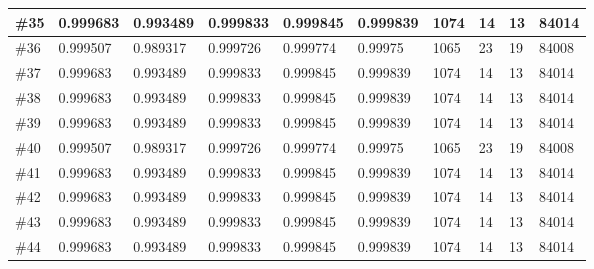 \begin{longtable}{l|l|l|l|l|l|l|l|l|l}
\#35 & 0.999683 & 0.993489 & 0.999833 & 0.999845 & 0.999839 & 1074 & 14 & 13 & 84014 \\ \hline
\#36 & 0.999507 & 0.989317 & 0.999726 & 0.999774 & 0.99975  & 1065 & 23 & 19 & 84008 \\ \hline
\#37 & 0.999683 & 0.993489 & 0.999833 & 0.999845 & 0.999839 & 1074 & 14 & 13 & 84014 \\ \hline
\#38 & 0.999683 & 0.993489 & 0.999833 & 0.999845 & 0.999839 & 1074 & 14 & 13 & 84014 \\ \hline
\#39 & 0.999683 & 0.993489 & 0.999833 & 0.999845 & 0.999839 & 1074 & 14 & 13 & 84014 \\ \hline
\#40 & 0.999507 & 0.989317 & 0.999726 & 0.999774 & 0.99975  & 1065 & 23 & 19 & 84008 \\ \hline
\#41 & 0.999683 & 0.993489 & 0.999833 & 0.999845 & 0.999839 & 1074 & 14 & 13 & 84014 \\ \hline
\#42 & 0.999683 & 0.993489 & 0.999833 & 0.999845 & 0.999839 & 1074 & 14 & 13 & 84014 \\ \hline
\#43 & 0.999683 & 0.993489 & 0.999833 & 0.999845 & 0.999839 & 1074 & 14 & 13 & 84014 \\ \hline
\#44 & 0.999683 & 0.993489 & 0.999833 & 0.999845 & 0.999839 & 1074 & 14 & 13 & 84014 \\ \hline


\end{longtable}











